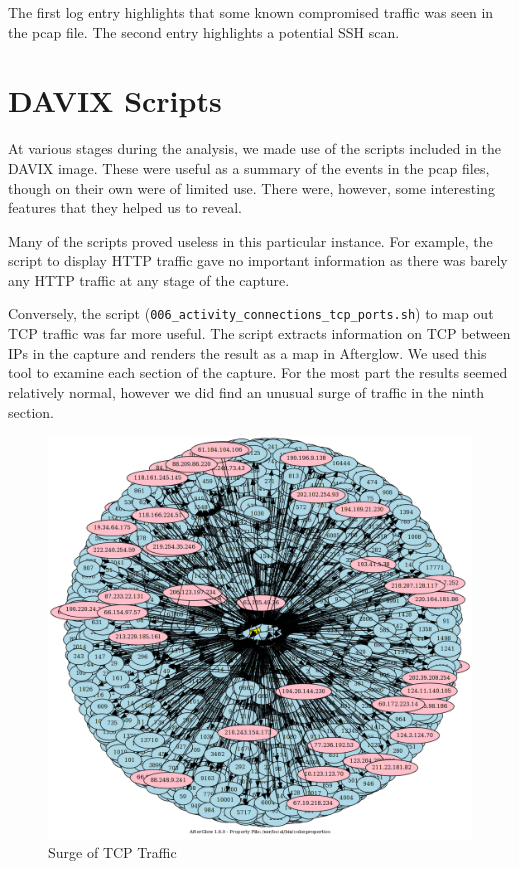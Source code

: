 \documentclass[a4paper,
    11pt,
    normalheadings,
    parindent,
    UKenglish,
    abstracton,
    ]{scrartcl}
\newcommand{\FIXME}[1]{\mbox{}\marginpar{\footnotesize\raggedright\hspace{0pt}\color{red}\emph{#1}}}
\begin{document}
The first log entry highlights that some known compromised traffic was seen in the pcap file.
The second entry highlights a potential SSH scan.




\section{DAVIX Scripts}  \label{sec:davix}
At various stages during the analysis, we made use of the scripts included in the DAVIX image.
These were useful as a summary of the events in the pcap files, though on their own were of limited use.
There were, however, some interesting features that they helped us to reveal.

Many of the scripts proved useless in this particular instance.
For example, the script to display HTTP traffic gave no important information as there was barely any HTTP traffic at any stage of the capture.

Conversely, the script (\texttt{006\_activity\_connections\_tcp\_ports.sh}) to map out TCP traffic was far more useful.
The script extracts information on TCP between IPs in the capture and renders the result as a map in Afterglow.
We used this tool to examine each section of the capture.
For the most part the results seemed relatively normal, however we did find an unusual surge of traffic in the ninth section.

\begin{figure}
    \begin{center}\includegraphics[width=\textwidth]{bin/09_messy.png}\end{center}
    \caption{Surge of TCP Traffic}
    \label{pic:messy_chart}
\end{figure}
\end{document}

